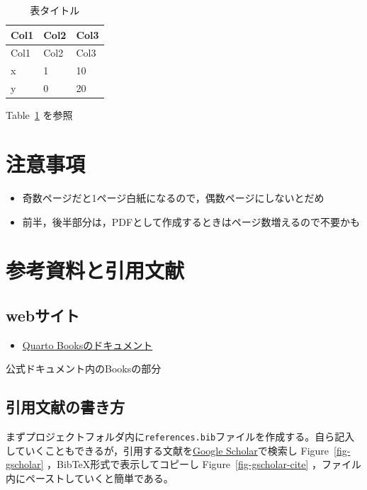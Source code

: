 \documentclass[
  b5paper,
  xelatex, ja=standard]{bxjsbook}
\providecommand{\tightlist}{%
  \setlength{\itemsep}{0pt}\setlength{\parskip}{0pt}}\usepackage{longtable,booktabs,array}
\begin{document}
\begin{longtable}[]{@{}lll@{}}
\caption{表タイトル}\label{tbl-hyo}\tabularnewline
\toprule\noalign{}
Col1 & Col2 & Col3 \\
\midrule\noalign{}
\endfirsthead
\toprule\noalign{}
Col1 & Col2 & Col3 \\
\midrule\noalign{}
\endhead
\bottomrule\noalign{}
\endlastfoot
x & 1 & 10 \\
y & 0 & 20 \\
\end{longtable}

Table~\ref{tbl-hyo} を参照


\chapter{注意事項}\label{sec-caution}

\begin{itemize}
\tightlist
\item
  奇数ページだと1ページ白紙になるので，偶数ページにしないとだめ
\item
  前半，後半部分は，PDFとして作成するときはページ数増えるので不要かも
\end{itemize}


\chapter{参考資料と引用文献}\label{sec-sanko}

\section{webサイト}\label{webux30b5ux30a4ux30c8}

\begin{itemize}
\tightlist
\item
  \href{https://quarto.org/docs/books/}{Quarto Booksのドキュメント}
\end{itemize}

公式ドキュメント内のBooksの部分

\section{引用文献の書き方}\label{ux5f15ux7528ux6587ux732eux306eux66f8ux304dux65b9}

まずプロジェクトフォルダ内に\texttt{references.bib}ファイルを作成する。自ら記入していくこともできるが，引用する文献を\href{https://scholar.google.com/}{Google
Scholar}で検索し Figure~\ref{fig-gscholar}
，BibTeX形式で表示してコピーし Figure~\ref{fig-gscholar-cite}
，ファイル内にペーストしていくと簡単である。
\end{document}
